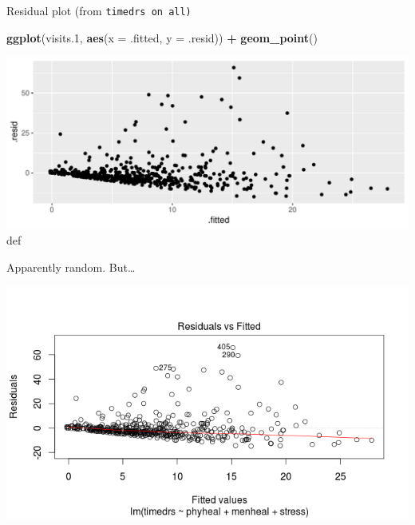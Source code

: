 \documentclass[ignorenonframetext,]{beamer}
\newenvironment{Shaded}{\begin{snugshade}}{\end{snugshade}}
\newcommand{\DataTypeTok}[1]{\textcolor[rgb]{0.13,0.29,0.53}{#1}}
\newcommand{\FloatTok}[1]{\textcolor[rgb]{0.00,0.00,0.81}{#1}}
\newcommand{\KeywordTok}[1]{\textcolor[rgb]{0.13,0.29,0.53}{\textbf{#1}}}
\newcommand{\NormalTok}[1]{#1}
\newcommand{\OperatorTok}[1]{\textcolor[rgb]{0.81,0.36,0.00}{\textbf{#1}}}
\newcommand{\StringTok}[1]{\textcolor[rgb]{0.31,0.60,0.02}{#1}}
\begin{document}
\begin{frame}[fragile]{Residual plot (from \texttt{timedrs\ on\ all)}}
\protect\hypertarget{residual-plot-from-timedrs-on-all}{}

\begin{Shaded}
\begin{Highlighting}[]
\KeywordTok{ggplot}\NormalTok{(visits}\FloatTok{.1}\NormalTok{, }\KeywordTok{aes}\NormalTok{(}\DataTypeTok{x =}\NormalTok{ .fitted, }\DataTypeTok{y =}\NormalTok{ .resid)) }\OperatorTok{+}\StringTok{ }\KeywordTok{geom_point}\NormalTok{()}
\end{Highlighting}
\end{Shaded}

\includegraphics{figure/iffy8-1.pdf} def

Apparently random. But\ldots

\includegraphics{regressx1.png}

\end{frame}
\end{document}
